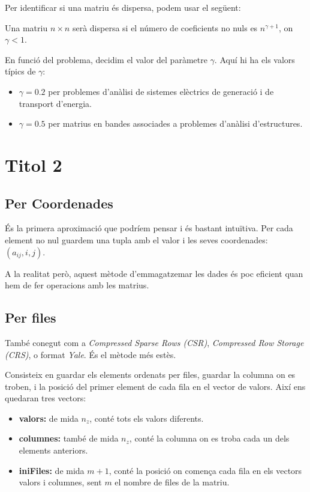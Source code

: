 \documentclass[11pt,a4paper,twoside]{report}
\begin{document}
Per identificar si una matriu és dispersa, podem usar el següent:

\qquad Una matriu $n \times n$ serà dispersa si el número de coeficients no nuls es $n^{\gamma+1}$, on $\gamma < 1$.

En funció del problema, decidim el valor del paràmetre $\gamma$. Aquí hi ha els valors típics de $\gamma$:
\begin{itemize}
\item $\gamma=0.2$ per problemes d'anàlisi de sistemes elèctrics de generació i de transport d'energia.
\item $\gamma=0.5$ per matrius en bandes associades a problemes d'anàlisi d'estructures.
\end {itemize}

\chapter{Titol 2}

\section{Per Coordenades}

És la primera aproximació que podríem pensar i és bastant intuïtiva. Per cada element no nul guardem una tupla amb el valor i les seves coordenades: $(a_{i j}, i, j)$. 

A la realitat però, aquest mètode d'emmagatzemar les dades és poc eficient quan hem de fer operacions amb les matrius.

\section{Per files}  
	
També conegut com a \textit{Compressed Sparse Rows (CSR)}, \textit{Compressed Row Storage (CRS)}, o format \textit{Yale}. És el mètode més estès.

Consisteix en guardar els elements ordenats per files, guardar la columna on es troben, i la posició del primer element de cada fila en el vector de valors.
Així ens quedaran tres vectors:
\begin{itemize}
	\item \textbf{valors:} de mida $n_z$, conté tots els valors diferents.
	\item \textbf{columnes:} també de mida $n_z$, conté la columna on es troba cada un dels elements anteriors.
	\item \textbf{iniFiles:} de mida $m+1$, conté la posició on comença cada fila en els vectors valors i columnes, sent $m$ el nombre de files de la matriu. 
\end{itemize}
\end{document}
